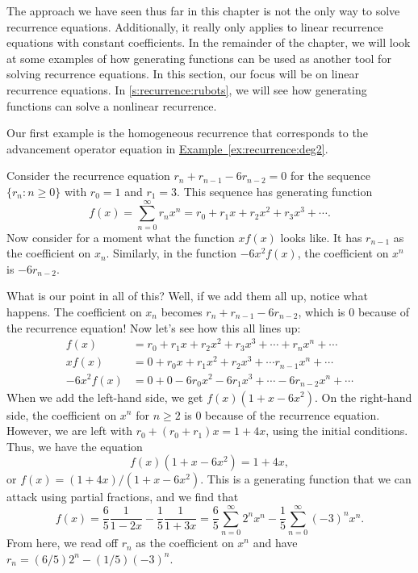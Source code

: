 The approach we have seen thus far in this chapter is not the only way
to solve recurrence equations. Additionally, it really only applies to
linear recurrence equations with constant coefficients. In the
remainder of the chapter, we will look at some examples of how
generating functions can be used as another tool for solving
recurrence equations. In this section, our focus will be on linear
recurrence equations. In \autoref{s:recurrence:rubots}, we will see
how generating functions can solve a nonlinear recurrence.

Our first example is the homogeneous recurrence that corresponds to
the advancement operator equation in
\hyperref[ex:recurrence:deg2]{Example~\ref*{ex:recurrence:deg2}}.

\begin{example}\label{ex:recurrence:gf-homog}
  Consider the recurrence equation $r_{n}+r_{n-1}-6r_{n-2} = 0$ for the
  sequence $\{r_n\colon n\geq 0\}$ with $r_0=1$ and $r_1=3$. This
  sequence has generating function
  \[f(x) = \sum_{n=0}^\infty r_n x^n = r_0+r_1
  x+r_2x^2+r_3x^3+\cdots.\]
  Now consider for a moment what the function $xf(x)$ looks like. It
  has $r_{n-1}$ as the coefficient on $x_n$. Similarly, in the
  function $-6x^2 f(x)$, the coefficient on $x^n$ is $-6r_{n-2}$. 

  What is our point in all of this? Well, if we add them all up,
  notice what happens. The coefficient on $x_n$ becomes
  $r_n+r_{n-1}-6r_{n-2}$, which is $0$ because of the recurrence
  equation! Now let's see how this all lines up:
  \begin{align*}
    f(x) &= r_0 + r_1 x + r_2x^2 + r_3 x^3 + \cdots + r_nx^n + \cdots\\
    xf(x) &= 0 + r_0 x + r_1x^2 + r_2 x^3 + \cdots r_{n-1}x^n + \cdots\\
    -6x^2f(x) & = 0 + 0 -6r_0x^2 - 6r_1 x^3 + \cdots - 6r_{n-2}x^n + \cdots
  \end{align*}
  When we add the left-hand side, we get $f(x)(1+x-6x^2)$. On the
  right-hand side, the coefficient on $x^n$ for $n\geq 2$ is $0$
  because of the recurrence equation. However, we are left with $r_0 +
  (r_0+r_1)x = 1 + 4x$, using the initial conditions. Thus, we have
  the equation
  \[f(x)(1+x-6x^2)= 1+4x,\]
  or $f(x) = (1+4x)/(1+x-6x^2)$. This is a generating function that we
  can attack using partial fractions, and we find that
  \[f(x) = \frac{6}{5}\frac{1}{1-2x}-\frac{1}{5}\frac{1}{1+3 x} =
  \frac{6}{5}\sum_{n=0}^\infty 2^n x^n -\frac{1}{5} \sum_{n=0}^\infty
  (-3)^n x^n.\]
  From here, we read off $r_n$ as the coefficient on $x^n$ and
  have $r_n = (6/5) 2^n -(1/5)(-3)^n$.
\end{example}


